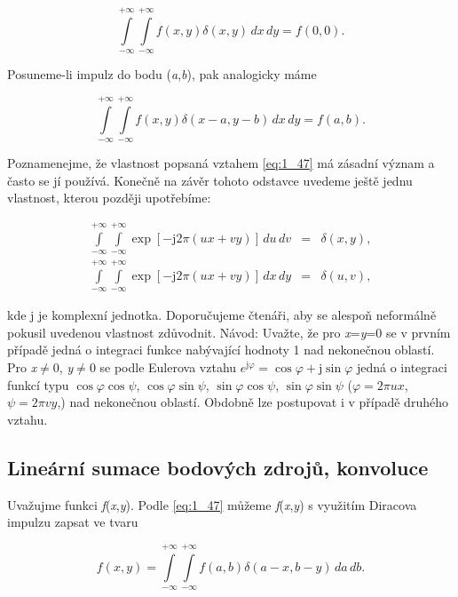 \begin{equation} \label{eq:1_46}
    \int\limits_{-\infty}^{+\infty} \int\limits_{-\infty}^{+\infty} f(x, y) \delta(x, y)\, dx\, dy = f(0, 0).
\end{equation}

Posuneme-li impulz do bodu (\textit{a},\textit{b}), pak analogicky máme

\begin{equation} \label{eq:1_47}
    \int\limits_{-\infty}^{+\infty} \int\limits_{-\infty}^{+\infty} f(x, y) \delta(x-a, y-b)\, dx\, dy = f(a, b).
\end{equation}

Poznamenejme, že vlastnost popsaná vztahem \eqref{eq:1_47} má zásadní význam a často se jí používá. Konečně na závěr tohoto odstavce uvedeme ještě jednu vlastnost, kterou později upotřebíme:

\begin{eqnarray} \label{eq:1_48}
    \int\limits_{-\infty}^{+\infty} \int\limits_{-\infty}^{+\infty} \exp \left[ -\mathrm{j} 2 \pi \left(ux + vy\right) \right] \, du\, dv &=& \delta(x, y), \\
    \int\limits_{-\infty}^{+\infty} \int\limits_{-\infty}^{+\infty} \exp \left[ -\mathrm{j} 2 \pi \left( ux + vy \right) \right] \,dx \,dy &=& \delta(u, v),\nonumber
\end{eqnarray}

kde j je komplexní jednotka. Doporučujeme čtenáři, aby se alespoň neformálně pokusil uvedenou vlastnost zdůvodnit. Návod: Uvažte, že pro \textit{x}=\textit{y}=0 se v prvním případě jedná o integraci funkce nabývající hodnoty 1 nad nekonečnou oblastí. Pro \textit{x}$\neq$0, \textit{y}$\neq$0 se podle Eulerova vztahu $e^{\mathrm{j}\varphi} = \cos\varphi + \mathrm{j} \sin\varphi$ jedná o integraci funkcí typu $\cos\varphi\cos\psi$, $\cos\varphi\sin\psi$, $\sin\varphi\cos\psi$, $\sin\varphi\sin\psi$ ($\varphi=2\pi ux$, $\psi=2\pi vy$,) nad nekonečnou oblastí. Obdobně lze postupovat i v případě druhého vztahu.

\subsection*{Lineární sumace bodových zdrojů, konvoluce}

Uvažujme funkci \textit{f}(\textit{x},\textit{y}). Podle \eqref{eq:1_47} můžeme \textit{f}(\textit{x},\textit{y}) s využitím Diracova impulzu zapsat ve tvaru

\begin{equation} \label{eq:1_49}
    f(x, y) = \int\limits_{-\infty}^{+\infty} \int\limits_{-\infty}^{+\infty} f(a, b) \delta(a-x, b-y) \,da \,db.
\end{equation}

